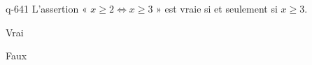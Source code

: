 \begin{truefalse}{q-641}
L'assertion « $x\geq 2 \Leftrightarrow x \geq 3$ » est vraie si et seulement si $x\geq 3$.
\item Vrai
\item* Faux
\end{truefalse}

